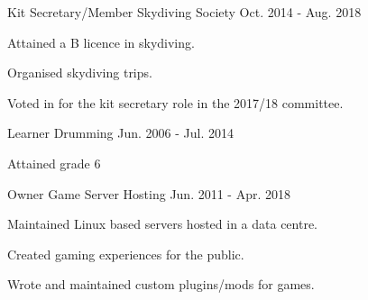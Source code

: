 

\begin{cventries}

  \cventry
    {Kit Secretary/Member} %
    {Skydiving Society} %
    {} %
    {Oct. 2014 - Aug. 2018} %
    {
      \begin{cvmitems} %
        \item {Attained a B licence in skydiving.}
        \item {Organised skydiving trips.}
        \item {Voted in for the kit secretary role in the 2017/18 committee.}
      \end{cvmitems}
    }

  \cventry
    {Learner} %
    {Drumming} %
    {} %
    {Jun. 2006 - Jul. 2014} %
    {
      \begin{cvitems} %
        \item {Attained grade 6}
      \end{cvitems}
    }

  \cventry
    {Owner} %
    {Game Server Hosting} %
    {} %
    {Jun. 2011 - Apr. 2018} %
    {
      \begin{cvmitems} %
        \item {Maintained Linux based servers hosted in a data centre.}
        \item {Created gaming experiences for the public.}
        \item {Wrote and maintained custom plugins/mods for games.}
      \end{cvmitems}
    }

\end{cventries}
